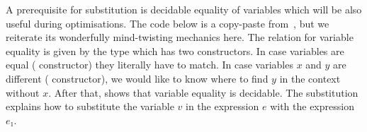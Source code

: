 A prerequisite for substitution is decidable equality
of variables which will be also useful during optimisations.  The code below
is a copy-paste from~\cite{subst}, but we reiterate its wonderfully mind-twisting
mechanics here.  The relation for variable equality is given by the type 
which has two constructors.  In case variables are equal ( constructor)
they literally have to match.  In case variables $x$ and $y$ are different
( constructor), we would like to know where to find $y$ in the context
without $x$.  After that,  shows that variable equality is decidable.
The substitution  explains how to substitute the variable $v$ in the
expression $e$ with the expression $e₁$. 
\begin{mathpar}
\end{mathpar}
